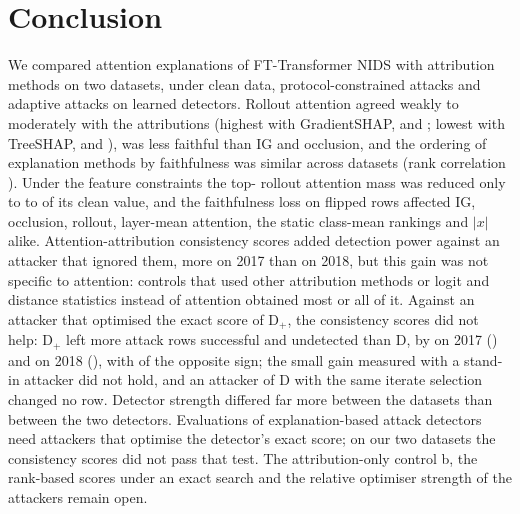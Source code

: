 \section{Conclusion}
\label{sec:conclusion}

We compared attention explanations of FT-Transformer NIDS with attribution methods on two datasets, under clean data,
protocol-constrained attacks and adaptive attacks on learned detectors.
Rollout attention agreed weakly to moderately with the attributions (highest with GradientSHAP,
\spRolloutGShapVoneSeventeen{} and \spRolloutGShapVoneEighteen; lowest with TreeSHAP, \spRolloutTreeShapVoneSeventeen{}
and \spRolloutTreeShapVoneEighteen), was less faithful than IG and occlusion, and the ordering of \nMethods{}
explanation methods by faithfulness was similar across datasets (rank correlation \ordSpDelVone).
Under the feature constraints the top-\paramTopK{} rollout attention mass was reduced only to \massAtwoVoneEighteen{} to
\massAtwoVoneSeventeen{} of its clean value, and the faithfulness loss on flipped rows affected IG, occlusion, rollout,
layer-mean attention, the static class-mean rankings and $|x|$ alike.
Attention-attribution consistency scores added detection power against an attacker that ignored them, more on 2017
than on 2018, but this gain was not specific to attention: controls that used other attribution methods or logit and
distance statistics instead of attention obtained most or all of it.
Against an attacker that optimised the exact score of D$_+$, the consistency scores did not help: D$_+$ left more attack
rows successful and undetected than D, by \axHeadVoneSeventeenAbs{} on 2017 (\axHeadVoneSeventeenCI) and
\axHeadVoneEighteenAbs{} on 2018 (\axHeadVoneEighteenCI), with \axHeadOppSeedsPhrase{} of the
opposite sign; the small gain measured with a stand-in attacker did not hold, and an attacker of D with the same iterate
selection changed no row.
Detector strength differed far more between the datasets than between the two detectors.
Evaluations of explanation-based attack detectors need attackers that optimise the detector's exact score; on our two
datasets the consistency scores did not pass that test.
The attribution-only control b, the rank-based scores under an exact search and the relative optimiser strength of the
attackers remain open.

